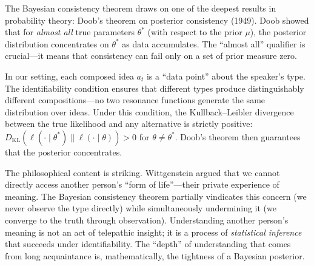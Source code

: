 \begin{remark}
The Bayesian consistency theorem draws on one of the deepest results
in probability theory: Doob's theorem on posterior consistency (1949).
Doob showed that for \emph{almost all} true parameters $\theta^*$
(with respect to the prior $\mu$), the posterior distribution concentrates
on $\theta^*$ as data accumulates.  The ``almost all'' qualifier is
crucial---it means that consistency can fail only on a set of prior
measure zero.

In our setting, each composed idea $a_t$ is a ``data point'' about the
speaker's type.  The identifiability condition ensures that different
types produce distinguishably different compositions---no two resonance
functions generate the same distribution over ideas.  Under this condition,
the Kullback--Leibler divergence between the true likelihood and any
alternative is strictly positive: $D_{\mathrm{KL}}(\ell(\cdot \mid \theta^*)
\| \ell(\cdot \mid \theta)) > 0$ for $\theta \neq \theta^*$.  Doob's
theorem then guarantees that the posterior concentrates.

The philosophical content is striking.  Wittgenstein argued that we
cannot directly access another person's ``form of life''---their private
experience of meaning.  The Bayesian consistency theorem partially
vindicates this concern (we never observe the type directly) while
simultaneously undermining it (we converge to the truth through
observation).  Understanding another person's meaning is not an act of
telepathic insight; it is a process of \emph{statistical inference} that
succeeds under identifiability.  The ``depth'' of understanding that
comes from long acquaintance is, mathematically, the tightness of a
Bayesian posterior.
\end{remark}


